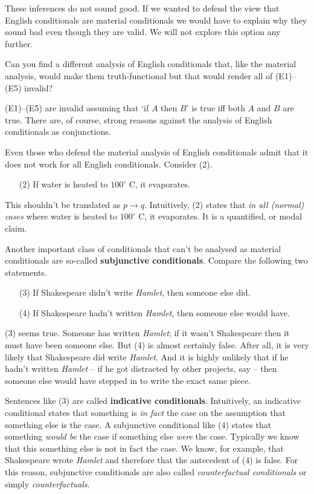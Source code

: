 These inferences do not sound good. If we wanted to defend the view that English
conditionals are material conditionals we would have to explain why they sound
bad even though they are valid. We will not explore this option any further.

\begin{exercise}
  Can you find a different analysis of English conditionals that, like the
  material analysis, would make them truth-functional but that would render all
  of (E1)--(E5) invalid?
\end{exercise}
\begin{solution}
  (E1)--(E5) are invalid assuming that `if $A$ then $B$' is true iff both $A$
  and $B$ are true. There are, of course, strong reasons against the analysis of
  English conditionals as conjunctions.
\end{solution}

Even those who defend the material analysis of English conditionals admit that
it does not work for all English conditionals. Consider (2).
\begin{enumerate}[leftmargin=10mm]
\item[(2)] If water is heated to $100^\circ$ C, it evaporates.
\end{enumerate}
This shouldn't be translated as $p\to q$. Intuitively, (2) states that \emph{in
  all (normal) cases} where water is heated to $100^\circ$ C, it evaporates. It
is a quantified, or modal claim.

Another important class of conditionals that can't be analysed as material
conditionals are so-called \textbf{subjunctive conditionals}. Compare the
following two statements.

\begin{enumerate}[leftmargin=10mm]
  \itemsep-1mm
\item[(3)] If Shakespeare didn't write \emph{Hamlet}, then someone else did.
\item[(4)] If Shakespeare hadn't written \emph{Hamlet}, then someone else
  would have.
\end{enumerate}
%
(3) seems true. Someone has written \emph{Hamlet}; if it wasn't Shakespeare then
it must have been someone else. But (4) is almost certainly false. After all, it
is very likely that Shakespeare did write \emph{Hamlet}. And it is highly
unlikely that if he hadn't written \emph{Hamlet} -- if he got distracted by
other projects, say -- then someone else would have stepped in to write the
exact same piece.

Sentences like (3) are called \textbf{indicative conditionals}. Intuitively, an
indicative conditional states that something is \emph{in fact} the case on the
assumption that something else is the case. A subjunctive conditional like (4)
states that something \emph{would be} the case if something else \emph{were} the
case. Typically we know that this something else is not in fact the case. We
know, for example, that Shakespeare wrote \emph{Hamlet} and therefore that the
antecedent of (4) is false. For this reason, subjunctive conditionals are also
called \emph{counterfactual conditionals} or simply \emph{counterfactuals}.

